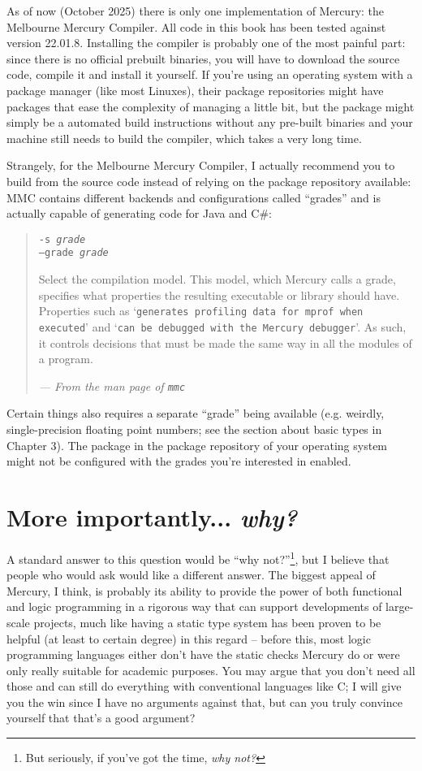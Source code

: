 As of now (October 2025) there is only one implementation of Mercury: the Melbourne Mercury Compiler. All code in this book has been tested against version 22.01.8. Installing the compiler is probably one of the most painful part: since there is no official prebuilt binaries, you will have to download the source code, compile it and install it yourself. If you're using an operating system with a package manager (like most Linuxes), their package repositories might have packages that ease the complexity of managing a little bit, but the package might simply be a automated build instructions without any pre-built binaries and your machine still needs to build the compiler, which takes a very long time.

Strangely, for the Melbourne Mercury Compiler, I actually recommend you to build from the source code instead of relying on the package repository available: MMC contains different backends and configurations called ``grades'' and is actually capable of generating code for Java and C#:

\begin{quote}
  \texttt{-s \textit{grade}}\\
  \texttt{--grade \textit{grade}}
  
  Select the compilation model. This model, which Mercury calls a grade, specifies what properties the resulting executable or library should have. Properties such as `\texttt{generates profiling data for mprof when executed}' and `\texttt{can be debugged with the Mercury debugger}'. As such, it controls decisions that must be made the same way in all the modules of a program.

  \textit{--- From the man page of \texttt{mmc}}
\end{quote}

Certain things also requires a separate ``grade'' being available (e.g. weirdly, single-precision floating point numbers; see the section about basic types in Chapter 3). The package in the package repository of your operating system might not be configured with the grades you're interested in enabled.

\section{More importantly... \textit{why?}}

A standard answer to this question would be ``why not?''\footnote{But seriously, if you've got the time, \textit{why not?}}, but I believe that people who would ask would like a different answer. The biggest appeal of Mercury, I think, is probably its ability to provide the power of both functional and logic programming in a rigorous way that can support developments of large-scale projects, much like having a static type system has been proven to be helpful (at least to certain degree) in this regard -- before this, most logic programming languages either don't have the static checks Mercury do or were only really suitable for academic purposes. You may argue that you don't need all those and can still do everything with conventional languages like C; I will give you the win since I have no arguments against that, but can you truly convince yourself that that's a good argument?


